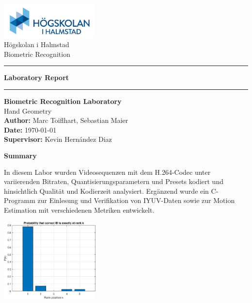 \documentclass[a4paper,12pt]{article}
\begin{document}
\begin{titlepage}
    \centering
    \includegraphics[width=5cm]{Resources/hogskolan-halmstad-logo.png} \\[0.5cm] %
    Högskolan i Halmstad \\[0.2cm]
    Biometric Recognition \\[1.5cm]
    
    \hrule
    \vspace{0.4cm} %
    {\LARGE \textbf{Laboratory Report}}
    \vspace{0.4cm}
    \hrule
    \vspace{1.5cm} %

    {\Large \textbf{Biometric Recognition Laboratory}} \\[0.2cm]
    {\Large Hand Geometry} \\[1cm]
    
    \textbf{Author:} Marc Toiflhart, Sebastian Maier \\[0.2cm]
    \textbf{Date:} \today \\[0.2cm]
    \textbf{Supervisor:} Kevin Hernández Diaz

    \vfill
\end{titlepage}
\newpage

\begin{center}
    \textbf{Summary}
\end{center}
In diesem Labor wurden Videosequenzen mit dem H.264-Codec unter variierenden Bitraten, Quantisierungsparametern und Presets kodiert und hinsichtlich Qualität und Kodierzeit analysiert. Ergänzend wurde ein C-Programm zur Einlesung und Verifikation von IYUV-Daten sowie zur Motion Estimation mit verschiedenen Metriken entwickelt.

\vspace{0.4cm} %
\centering
\includegraphics[width=5cm]{Resources/rank_plot.eps} \\[0.5cm]

\tableofcontents
\newpage

\listoffigures
\newpage

\listoftables
\newpage


\newpage
\printbibliography
\end{document}
